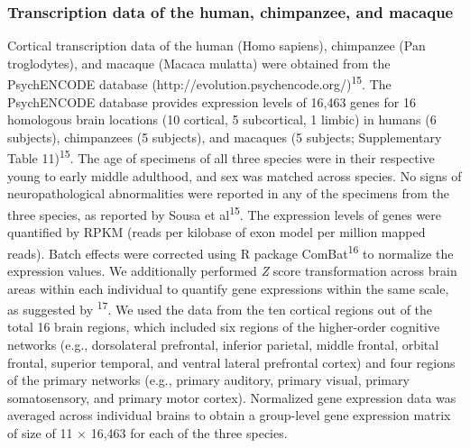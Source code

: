 \begin{refsection}
\subsubsection*{Transcription data of the human, chimpanzee, and macaque}
Cortical transcription data of the human (Homo sapiens), chimpanzee (Pan troglodytes), and macaque (Macaca mulatta) were obtained from the PsychENCODE database (http://evolution.psychencode.org/)\textsuperscript{15}. The PsychENCODE database provides expression levels of 16,463 genes for 16 homologous brain locations (10 cortical, 5 subcortical, 1 limbic) in humans (6 subjects), chimpanzees (5 subjects), and macaques (5 subjects; Supplementary Table 11)\textsuperscript{15}. The age of specimens of all three species were in their respective young to early middle adulthood, and sex was matched across species. No signs of neuropathological abnormalities were reported in any of the specimens from the three species, as reported by Sousa et al\textsuperscript{15}. The expression levels of genes were quantified by RPKM (reads per kilobase of exon model per million mapped reads). Batch effects were corrected using R package ComBat\textsuperscript{16} to normalize the expression values. We additionally performed \textit{Z} score transformation across brain areas within each individual to quantify gene expressions within the same scale, as suggested by \textsuperscript{17}. We used the data from the ten cortical regions out of the total 16 brain regions, which included six regions of the higher-order cognitive networks (e.g., dorsolateral prefrontal, inferior parietal, middle frontal, orbital frontal, superior temporal, and ventral lateral prefrontal cortex) and four regions of the primary networks (e.g., primary auditory, primary visual, primary somatosensory, and primary motor cortex). Normalized gene expression data was averaged across individual brains to obtain a group-level gene expression matrix of size of 11 $ \times $  16,463 for each of the three species.


\end{refsection}
